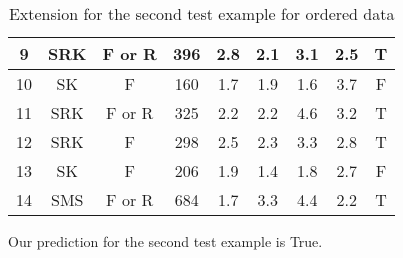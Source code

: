 \documentclass[12pt]{report}
\begin{document}
\begin{solution}
\begin{enumerate}
\begin{itemize}
\begin{table}[H]
\begin{tabular}{|c|c|c|c|c|c|c|c|c|}
                9  & \cellcolor[HTML]{FE0000}SRK & F or R & 396                         & 2.8 & 2.1                         & 3.1 & 2.5 & T         \\ \hline
                10 & SK                          & F      & \cellcolor[HTML]{FE0000}160 & 1.7 & 1.9                         & 1.6 & 3.7 & F         \\ \hline
                11 & \cellcolor[HTML]{FE0000}SRK & F or R & 325                         & 2.2 & 2.2                         & 4.6 & 3.2 & T         \\ \hline
                12 & \cellcolor[HTML]{FE0000}SRK & F      & 298                         & 2.5 & 2.3                         & 3.3 & 2.8 & T         \\ \hline
                13 & SK                          & F      & \cellcolor[HTML]{FE0000}206 & 1.9 & 1.4                         & 1.8 & 2.7 & F         \\ \hline
                14 & \cellcolor[HTML]{FE0000}SMS & F or R & 684                         & 1.7 & 3.3                         & 4.4 & 2.2 & T         \\ \hline
                \end{tabular}
                \caption{Extension for the second test example for ordered data}
                \label{table:ext2_1}
                \end{table}
              Our prediction for the second test example is True.
            \end{itemize}
            \vspace*{-0.8cm}


\end{enumerate}
\end{solution}
\end{document}
